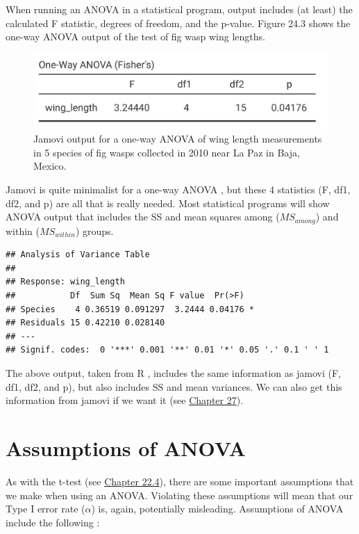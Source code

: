 \documentclass[
]{scrbook}
\begin{document}
When running an ANOVA in a statistical program, output includes (at least) the calculated F statistic, degrees of freedom, and the p-value.
Figure 24.3 shows the one-way ANOVA output of the test of fig wasp wing lengths.

\begin{figure}
\includegraphics[width=0.6\linewidth]{img/jamovi_ANOVA_output} \caption{Jamovi output for a one-way ANOVA of wing length measurements in 5 species of fig wasps collected in 2010 near La Paz in Baja, Mexico.}\label{fig:unnamed-chunk-115}
\end{figure}

Jamovi is quite minimalist for a one-way ANOVA \citep{Jamovi2022}, but these 4 statistics (F, df1, df2, and p) are all that is really needed.
Most statistical programs will show ANOVA output that includes the SS and mean squares among (\(MS_{among}\)) and within (\(MS_{within}\)) groups.

\begin{verbatim}
## Analysis of Variance Table
## 
## Response: wing_length
##           Df  Sum Sq  Mean Sq F value  Pr(>F)  
## Species    4 0.36519 0.091297  3.2444 0.04176 *
## Residuals 15 0.42210 0.028140                  
## ---
## Signif. codes:  0 '***' 0.001 '**' 0.01 '*' 0.05 '.' 0.1 ' ' 1
\end{verbatim}

The above output, taken from R \citep{Rproject}, includes the same information as jamovi (F, df1, df2, and p), but also includes SS and mean variances.
We can also get this information from jamovi if we want it (see \protect\hyperlink{Chapter_27}{Chapter 27}).

\hypertarget{assumptions-of-anova}{%
\section{Assumptions of ANOVA}\label{assumptions-of-anova}}

As with the t-test (see \protect\hyperlink{assumptions-of-t-tests}{Chapter 22.4}), there are some important assumptions that we make when using an ANOVA.
Violating these assumptions will mean that our Type I error rate (\(\alpha\)) is, again, potentially misleading.
Assumptions of ANOVA include the following \citep{Box1978, Sokal1995}:
\end{document}
